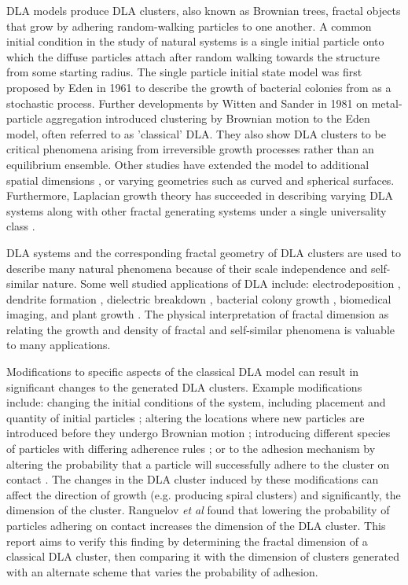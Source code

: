\documentclass[10pt, twocolumn]{article} %
\begin{document}
  DLA models produce DLA clusters, also known as Brownian trees, fractal objects that grow by adhering random-walking particles to one another. A common initial condition in the study of natural systems is a single initial particle onto which the diffuse particles attach after random walking towards the structure from some starting radius. The single particle initial state model was first proposed by Eden in 1961 \cite{Eden_1961} to describe the growth of bacterial colonies from as a stochastic process. Further developments by Witten and Sander in 1981 \cite{Witten_1981} on metal-particle aggregation introduced clustering by Brownian motion to the Eden model, often referred to as 'classical' DLA. They also show DLA clusters to be critical phenomena arising from irreversible growth processes rather than an equilibrium ensemble. Other studies have extended the model to additional spatial dimensions \cite{Ball_1984}, or varying geometries such as curved \cite{Choi_2011} and spherical \cite{Tenti_2021} surfaces. Furthermore, Laplacian growth theory has succeeded in describing varying DLA systems along with other fractal generating systems under a single universality class \cite{Mathiesen_2005, Carlock_2016}.

  DLA systems and the corresponding fractal geometry of DLA clusters are used to describe many natural phenomena because of their scale independence and self-similar nature. Some well studied applications of DLA include: electrodeposition \cite{Shaikh_2022}, dendrite formation \cite{Li_2008}, dielectric breakdown \cite{Pietronero_1984, Irurzun_2002}, bacterial colony growth \cite{Eden_1961}, biomedical imaging\cite{Choi_2011}, and plant growth \cite{Mandelbrot_1982, Zhang_2007}. The physical interpretation of fractal dimension as relating the growth and density of fractal and self-similar phenomena is valuable to many applications.

  Modifications to specific aspects of the classical DLA model can result in significant changes to the generated DLA clusters. Example modifications include: changing the initial conditions of the system, including placement and quantity of initial particles \cite{Choi_2011}; altering the locations where new particles are introduced before they undergo Brownian motion \cite{Ranguelov_2011}; introducing different species of particles with differing adherence rules \cite{Ranguelov_2011}; or to the adhesion mechanism by altering the probability that a particle will successfully adhere to the cluster on contact \cite{Ranguelov_2011}. The changes in the DLA cluster induced by these modifications can affect the direction of growth (e.g. producing spiral clusters) and significantly, the dimension of the cluster. Ranguelov \textit{et al} \cite{Ranguelov_2011} found that lowering the probability of particles adhering on contact increases the dimension of the DLA cluster. This report aims to verify this finding by determining the fractal dimension of a classical DLA cluster, then comparing it with the dimension of clusters generated with an alternate scheme that varies the probability of adhesion.
\end{document}
